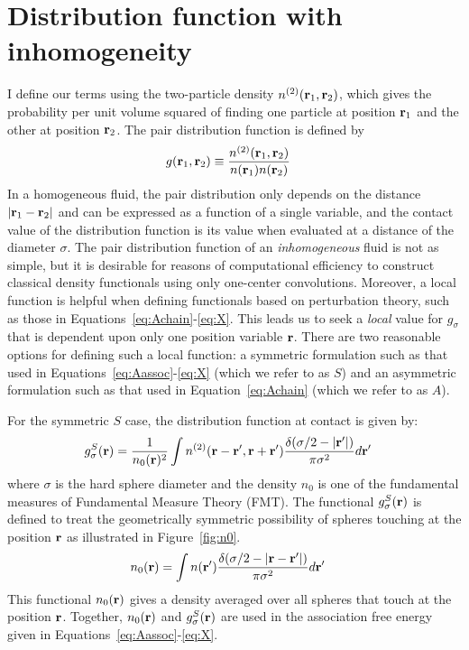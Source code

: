 \section{Distribution function with inhomogeneity}

I define our terms using the two-particle density
$n^{(2)}(\textbf{r}_1,\textbf{r}_2)$, which gives the probability per unit volume
squared of finding one particle at position $\textbf{r}_1$ and the other at
position $\textbf{r}_2$.  The pair distribution function is defined by
\begin{align}
  g(\textbf{r}_1,\textbf{r}_2) &\equiv \frac{n^{(2)}(\textbf{r}_1,\textbf{r}_2)}{n(\textbf{r}_1)n(\textbf{r}_2)}
\end{align}
In a homogeneous fluid, the pair distribution only depends on the
distance $|\textbf{r}_1-\textbf{r}_2|$ and can be expressed as a function of a
single variable, and the contact value of the distribution function is
its value when evaluated at a distance of the diameter $\sigma$.  The
pair distribution function of an \emph{inhomogeneous} fluid is not as
simple, but it is desirable for reasons of computational efficiency to
construct classical density functionals using only one-center
convolutions.  Moreover, a local function is helpful when defining
functionals based on perturbation theory, such as those in
Equations~\ref{eq:Achain}-\ref{eq:X}.  This leads
us to seek a \emph{local} value for $g_\sigma$ that is dependent upon
only one position variable $\textbf{r}$.  There are two reasonable options
for defining such a local function: a symmetric formulation such as
that used in Equations~\ref{eq:Aassoc}-\ref{eq:X} (which we refer to
as $S$) and an asymmetric formulation such as that used in
Equation~\ref{eq:Achain} (which we refer to as $A$).

For the symmetric $S$ case, the distribution function at contact is
given by:
\begin{align}
  g^S_\sigma(\textbf{r}) &= \frac{1}{n_0(\textbf{r})^2}\int n^{(2)}(\textbf{r} - \textbf{r}', \textbf{r}
  + \textbf{r}')
  \frac{\delta(\sigma/2 -|\textbf{r}'|)}{\pi\sigma^2}d\textbf{r}' \label{eq:gS}
\end{align}
where $\sigma$ is the hard sphere diameter and the density $n_0$ is one of
the fundamental measures of Fundamental Measure Theory (FMT).  The
functional $g^S_\sigma(\textbf{r})$ is defined to treat the geometrically
symmetric possibility of spheres touching at the position $\textbf{r}$ as
illustrated in Figure~\ref{fig:n0}.
\begin{align}
  n_0(\textbf{r}) &= \int n(\textbf{r}')\frac{\delta(\sigma/2 -|\textbf{r}-\textbf{r}'|)}{\pi\sigma^2} d\textbf{r}'
  \label{eq:n0}
\end{align}
This functional $n_0(\textbf{r})$ gives a density averaged over all spheres that touch at
the position $\textbf{r}$.  Together, $n_0(\textbf{r})$ and $g_\sigma^S(\textbf{r})$ are
used in the association free energy given in Equations~\ref{eq:Aassoc}-\ref{eq:X}.

